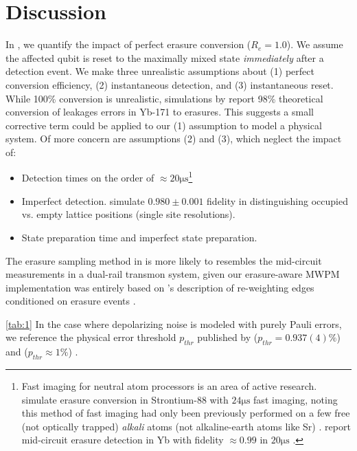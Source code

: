 \documentclass[11pt, notitlepage, letterpaper]{article}
\begin{document}
\section{Discussion}\label{sec:discussion}

In , we quantify the impact of perfect erasure conversion ($R_e=1.0$). We assume the affected qubit is reset to the maximally mixed state \emph{immediately} after a detection event. We make three unrealistic assumptions about (1) perfect conversion efficiency, (2) instantaneous detection, and (3) instantaneous reset. While 100\% conversion is unrealistic, simulations by \citeauthor{wu_erasure_2022} report 98\% theoretical conversion of leakages errors in Yb-171 to erasures. This suggests a small corrective term could be applied to our (1) assumption to model a physical system. Of more concern are assumptions (2) and (3), which neglect the impact of:
\begin{itemize}
    \item Detection times on the order of $\approx 20 \unit{\micro\second}$\footnote{Fast imaging for neutral atom processors is an area of active research. \citeauthor{scholl_erasure_2023} simulate erasure conversion in Strontium-88 with $24 \unit{\micro\second}$ fast imaging, noting this method of fast imaging had only been previously performed on a few free (not optically trapped) \emph{alkali} atoms (not alkaline-earth atoms like Sr) \citeauthor{scholl_erasure_2023}. \citeauthor{zhang_leveraging_2025} report mid-circuit erasure detection in Yb with fidelity $\approx 0.99$ in $20 \unit{\micro\second}$ \cite{zhang_leveraging_2025}.}
    \item Imperfect detection. \citeauthor{scholl_erasure_2023} simulate $0.980 \pm 0.001$ fidelity in distinguishing occupied vs. empty lattice positions (single site resolutions).
    \item State preparation time and imperfect state preparation.
\end{itemize}

The erasure sampling method in  is more likely to resembles the mid-circuit measurements in a dual-rail transmon system, given our erasure-aware MWPM implementation was entirely based on \citeauthor{gu_fault-tolerant_2025}'s description of re-weighting edges conditioned on erasure events \cite{gu_fault-tolerant_2025}.

\autoref{tab:1} In the case where depolarizing noise is modeled with purely Pauli errors, we reference the physical error threshold $p_{thr}$ published by \citeauthor{wu_erasure_2022} ($p_{thr} = 0.937(4)\%$) and \citeauthor{acharya_quantum_2025} ($p_{thr} \approx 1\%$) \cite{wu_erasure_2022}\cite{acharya_quantum_2025}.
\end{document}
